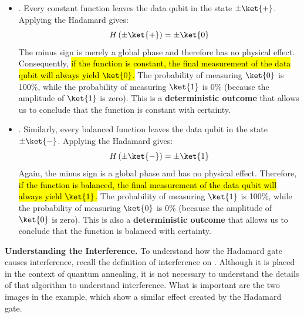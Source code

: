 \begin{itemize}
    \item {}. Every constant function leaves the data qubit in the state $\pm \ket{+}$. Applying the Hadamard gives:
    \begin{equation*}
        H\left(\pm \ket{+}\right) = \pm \ket{0}
    \end{equation*}
    The minus sign is merely a global phase and therefore has no physical effect. Consequently, \hl{if the function is constant, the final measurement of the data qubit will always yield $\ket{0}$.} The probability of measuring $\ket{0}$ is 100\%, while the probability of measuring $\ket{1}$ is 0\% (because the amplitude of $\ket{1}$ is zero). This is a \textbf{deterministic outcome} that allows us to conclude that the function is constant with certainty.


    \item {}. Similarly, every balanced function leaves the data qubit in the state $\pm \ket{-}$. Applying the Hadamard gives:
    \begin{equation*}
        H\left(\pm \ket{-}\right) = \pm \ket{1}
    \end{equation*}
    Again, the minus sign is a global phase and has no physical effect. Therefore, \hl{if the function is balanced, the final measurement of the data qubit will always yield $\ket{1}$.} The probability of measuring $\ket{1}$ is 100\%, while the probability of measuring $\ket{0}$ is 0\% (because the amplitude of $\ket{0}$ is zero). This is also a \textbf{deterministic outcome} that allows us to conclude that the function is balanced with certainty.
\end{itemize}
\textcolor{Green3}{ \textbf{Understanding the Interference.}} To understand how the Hadamard gate causes interference, recall the definition of interference on . Although it is placed in the context of quantum annealing, it is not necessary to understand the details of that algorithm to understand interference. 
What is important are the two images in the example, which show a similar effect created by the Hadamard gate.

